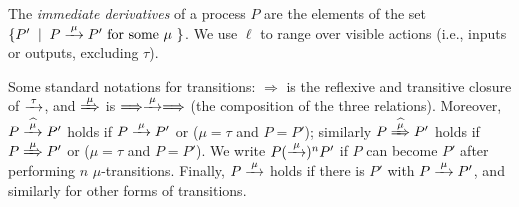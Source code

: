  The \emph{immediate derivatives} of a
process $P$ are the elements of  the set $\{P' \st P \arr\mu P' \mbox{ for some $\mu$ }
\}$.   
We use $\ell$ to range over
 visible actions (i.e.,  inputs or outputs, excluding  $\tau$).
\begin{figure*}
\begin{center}
 $\displaystyle{   P \arr\mu   P' \over   P + Q   \arr\mu
P'  } $  $ \hb$   
 $\displaystyle{   P \arr\mu   P' \over   P | Q   \arr\mu
P' | Q } $  $ \hb$   
  $\; \;$  $\displaystyle{ P \arr{ a}P' \hk \hk  Q
\arr{\outC a }Q'  \over     P|  Q \arr{ \tau} P'
|  Q'  }$ 
\\
\vskip .1cm
\hskip .6cm  
 $\displaystyle{  \over  \mu.  P    \arr\mu
P } $  $ \hb$   
\hskip .6cm  
$\displaystyle{ P \arr{\mu}P' \over
 (\res a\!)\, P   \arr{\mu} (\res a\!)\, P'} $ $ \mu \neq a, \outC a$
$ \hb$ %
\hskip .5cm 
$\displaystyle{ P \arr{\mu}P' \over
 K   \arr{ \mu} P'  } $  if  $  K \Defi P$
\end{center}
\caption{The LTS of CCS}
\label{f:LTSCCS}
\end{figure*}

Some standard notations for transitions:  $\Longrightarrow $ is the 
reflexive and  transitive closure of $\arr\tau $, and 
$\Arr \mu $ is $\Longrightarrow \arr\mu \Longrightarrow $ (the
composition of the three relations).
Moreover,   
$ 
P \arcap \mu P'$ holds if $P \arr\mu P'$ or ($\mu =\tau$ and
$P=P'$); similarly 
$ 
P \Arcap \mu P'$ holds if $P \Arr\mu P'$ or ($\mu =\tau$ and
$P=P'$).
We write $P (\arr\mu)^n P'$ if $P$ can become $P'$ after performing
$n$ $\mu$-transitions. Finally, $P \arr\mu$ holds if there is $P'$
with $P \arr\mu P'$, and similarly for other forms of transitions.




